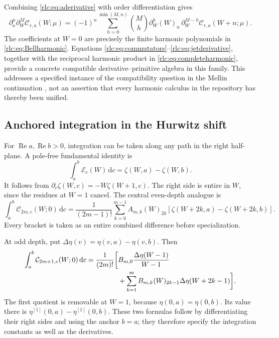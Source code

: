 \documentclass[11pt,a4paper]{article}
\numberwithin{equation}{section}
\theoremstyle{definition}\newtheorem{definition}[theorem]{Definition}
\theoremstyle{remark}\newtheorem{remark}[theorem]{Remark}
\DeclareMathOperator{\Rea}{Re}
\newcommand{\dd}{\,\mathrm d}
\newcommand{\E}{\mathcal E}
\newcommand{\CC}{\mathcal C}
\begin{document}
Combining \eqref{rlc:eq:aderivative} with order differentiation gives
\begin{equation}\label{rlc:eq:jetderivative}
 \partial_a^n\partial_W^M\CC_{r,a}(W;\mu)
 =(-1)^n\sum_{h=0}^{\min(M,n)}\binom Mh
       \partial_W^h(W)_n\,
       \partial_W^{M-h}\CC_{r,a}(W+n;\mu).
\end{equation}
The coefficients at $W=0$ are precisely the finite harmonic
polynomials in \eqref{rlc:eq:Bellharmonic}. Equations
\eqref{rlc:eq:commutators}--\eqref{rlc:eq:jetderivative}, together with
the reciprocal harmonic product in \eqref{rlc:eq:completeharmonic},
provide a concrete compatible derivative--primitive algebra in this
family. This addresses a specified instance of the compatibility
question in the Mellin continuation \cite{MLD}, not an assertion that
every harmonic calculus in the repository has thereby been unified.

\subsection{Anchored integration in the Hurwitz shift}
For $\Rea a,\Rea b>0$, integration can be taken along any path in the
right half-plane. A pole-free fundamental identity is
\begin{equation}\label{rlc:eq:Eprimitive}
 \int_a^b\E_c(W)\dd c=\zeta(W,a)-\zeta(W,b).
\end{equation}
It follows from $\partial_c\zeta(W,c)=-W\zeta(W+1,c)$.
The right side is entire in $W$, since the residues at $W=1$ cancel.
The central even-depth analogue is
\begin{equation}\label{rlc:eq:evenprimitive}
 \int_a^b\CC_{2m,c}(W;0)\dd c
 =\frac1{(2m-1)!}\sum_{k=0}^{m-1}A_{m,k}(W)_{2k}
      [\zeta(W+2k,a)-\zeta(W+2k,b)].
\end{equation}
Every bracket is taken as an entire combined difference before
specialization.

At odd depth, put $\Delta\eta(v)=\eta(v,a)-\eta(v,b)$. Then
\begin{align}
 \int_a^b\CC_{2m+1,c}(W;0)\dd c
 =\frac1{(2m)!}\biggl[&B_{m,0}\frac{\Delta\eta(W-1)}{W-1}\notag\\
 &+\sum_{k=1}^{m}B_{m,k}(W)_{2k-1}
                          \Delta\eta(W+2k-1)\biggr].
 \label{rlc:eq:oddprimitive}
\end{align}
The first quotient is removable at $W=1$, because $\eta(0,a)=\eta(0,b)$.
Its value there is $\eta^{[1]}(0,a)-\eta^{[1]}(0,b)$.
These two formulas follow by differentiating their right sides and using
the anchor $b=a$; they therefore specify the integration constants as
well as the derivatives.
\end{document}
